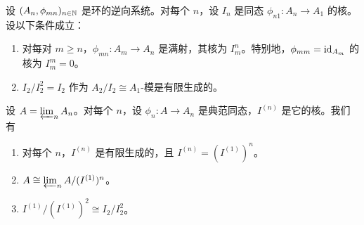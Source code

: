 \begin{proposition}\label{it:1.5.10}
设 $(A_n,\phi_{mn})_{n\in\mathbb{N}}$ 是环的逆向系统。对每个 $n$，设 $I_n$ 是同态 $\phi_{n1}\colon A_n\to A_1$ 的核。设以下条件成立：
\begin{enumerate}[label=(\alph*),leftmargin=2.8em]
  \item 对每对 $m\ge n$，$\phi_{mn}\colon A_m\to A_n$ 是满射，其核为 $I_m^n$。特别地，$\phi_{mm}=\operatorname{id}_{A_m}$ 的核为 $I_m^m=0$。
  \item $I_2/I_2^2=I_2$ 作为 $A_2/I_2\cong A_1$-模是有限生成的。
\end{enumerate}
设 $A=\varprojlim_n A_n$。对每个 $n$，设 $\phi_n\colon A\to A_n$ 是典范同态，$I^{(n)}$ 是它的核。我们有
\begin{enumerate}[label=(\roman*),leftmargin=2.8em]
  \item 对每个 $n$，$I^{(n)}$ 是有限生成的，且 $I^{(n)}=(I^{(1)})^n$。
  \item $A\cong\varprojlim_n A/(I^{(1)})^n$。
  \item $I^{(1)}/(I^{(1)})^2\cong I_2/I_2^2$。
\end{enumerate}
\end{proposition}


